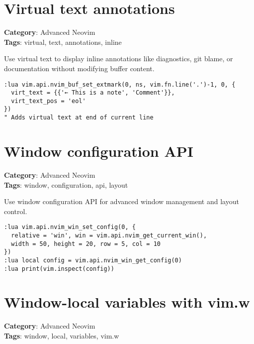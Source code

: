 \section{Virtual text annotations}

\textbf{Category}: Advanced Neovim\\ \textbf{Tags}: virtual, text, annotations, inline
\vspace{0.5cm}

Use virtual text to display inline annotations like diagnostics, git blame, or documentation without modifying buffer content.

\begin{Exa*}{}
\begin{Verbatim}[fontsize=\footnotesize, breaklines, breakanywhere]
:lua vim.api.nvim_buf_set_extmark(0, ns, vim.fn.line('.')-1, 0, {
  virt_text = {{'← This is a note', 'Comment'}},
  virt_text_pos = 'eol'
})
" Adds virtual text at end of current line
\end{Verbatim}
\end{Exa*}

\section{Window configuration API}

\textbf{Category}: Advanced Neovim\\ \textbf{Tags}: window, configuration, api, layout
\vspace{0.5cm}

Use window configuration API for advanced window management and layout control.

\begin{Exa*}{}
\begin{Verbatim}[fontsize=\footnotesize, breaklines, breakanywhere]
:lua vim.api.nvim_win_set_config(0, {
  relative = 'win', win = vim.api.nvim_get_current_win(),
  width = 50, height = 20, row = 5, col = 10
})
:lua local config = vim.api.nvim_win_get_config(0)
:lua print(vim.inspect(config))
\end{Verbatim}
\end{Exa*}

\section{Window-local variables with vim.w}

\textbf{Category}: Advanced Neovim\\ \textbf{Tags}: window, local, variables, vim.w
\vspace{0.5cm}

